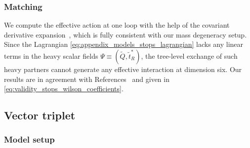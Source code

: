 



\subsubsection{Matching}

We compute the effective action at one loop with the help of the
covariant derivative expansion~\cite{Gaillard:1985uh,
  Henning:2014wua}, which is fully consistent with our mass degeneracy
setup. Since the Lagrangian
\autoref{eq:appendix_models_stops_lagrangian} lacks any linear terms
in the heavy scalar fields $\Psi \equiv (\tilde{Q}, \tilde{t}_R^*)$,
the tree-level exchange of such heavy partners cannot generate any
effective interaction at dimension six. Our results are in agreement
with References~\cite{Henning:2014wua, Drozd:2015kva, Drozd:2015rsp}
and given in \autoref{eq:validity_stops_wilson_coefficients}.



\subsection{Vector triplet}
\label{sec:appendix_models_triplet}

\subsubsection{Model setup}

